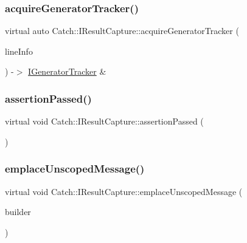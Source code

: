 \subsubsection{\texorpdfstring{acquire\+Generator\+Tracker()}{acquireGeneratorTracker()}}
{\footnotesize\ttfamily virtual auto Catch\+::\+I\+Result\+Capture\+::acquire\+Generator\+Tracker (\begin{DoxyParamCaption}\item[{\mbox{\hyperlink{struct_catch_1_1_source_line_info}{Source\+Line\+Info}} const \&}]{line\+Info }\end{DoxyParamCaption}) -\/$>$  \mbox{\hyperlink{struct_catch_1_1_i_generator_tracker}{I\+Generator\+Tracker}} \&\hspace{0.3cm}{\ttfamily [pure virtual]}}

\mbox{\label{struct_catch_1_1_i_result_capture_a9b0ef2cb071e9a9dc6ec1b533026aea7}} 
\subsubsection{\texorpdfstring{assertion\+Passed()}{assertionPassed()}}
{\footnotesize\ttfamily virtual void Catch\+::\+I\+Result\+Capture\+::assertion\+Passed (\begin{DoxyParamCaption}{ }\end{DoxyParamCaption})\hspace{0.3cm}{\ttfamily [pure virtual]}}

\mbox{\label{struct_catch_1_1_i_result_capture_a49f74f1323ef8be71b8f9b8e8b2c0fc2}} 
\subsubsection{\texorpdfstring{emplace\+Unscoped\+Message()}{emplaceUnscopedMessage()}}
{\footnotesize\ttfamily virtual void Catch\+::\+I\+Result\+Capture\+::emplace\+Unscoped\+Message (\begin{DoxyParamCaption}\item[{\mbox{\hyperlink{struct_catch_1_1_message_builder}{Message\+Builder}} const \&}]{builder }\end{DoxyParamCaption})\hspace{0.3cm}{\ttfamily [pure virtual]}}

